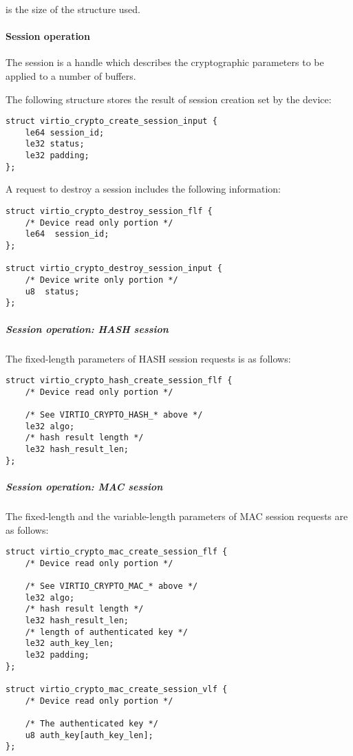  is the size of the structure used.


\paragraph{Session operation}\label{sec:Device Types / Crypto Device / Device
Operation / Control Virtqueue / Session operation}

The session is a handle which describes the cryptographic parameters to be
applied to a number of buffers.

The following structure stores the result of session creation set by the device:

\begin{lstlisting}
struct virtio_crypto_create_session_input {
    le64 session_id;
    le32 status;
    le32 padding;
};
\end{lstlisting}

A request to destroy a session includes the following information:

\begin{lstlisting}
struct virtio_crypto_destroy_session_flf {
    /* Device read only portion */
    le64  session_id;
};

struct virtio_crypto_destroy_session_input {
    /* Device write only portion */
    u8  status;
};
\end{lstlisting}


\subparagraph{Session operation: HASH session}\label{sec:Device Types / Crypto Device / Device
Operation / Control Virtqueue / Session operation / Session operation: HASH session}

The fixed-length parameters of HASH session requests is as follows:

\begin{lstlisting}
struct virtio_crypto_hash_create_session_flf {
    /* Device read only portion */

    /* See VIRTIO_CRYPTO_HASH_* above */
    le32 algo;
    /* hash result length */
    le32 hash_result_len;
};
\end{lstlisting}


\subparagraph{Session operation: MAC session}\label{sec:Device Types / Crypto Device / Device
Operation / Control Virtqueue / Session operation / Session operation: MAC session}

The fixed-length and the variable-length parameters of MAC session requests are as follows:

\begin{lstlisting}
struct virtio_crypto_mac_create_session_flf {
    /* Device read only portion */

    /* See VIRTIO_CRYPTO_MAC_* above */
    le32 algo;
    /* hash result length */
    le32 hash_result_len;
    /* length of authenticated key */
    le32 auth_key_len;
    le32 padding;
};

struct virtio_crypto_mac_create_session_vlf {
    /* Device read only portion */

    /* The authenticated key */
    u8 auth_key[auth_key_len];
};
\end{lstlisting}

